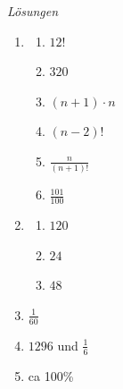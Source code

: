 \clearpage
\emph{Lösungen}

\begin{enumerate}
    \item
          \begin{enumerate}
              \item \(12!\)
              \item \(320\)
              \item \((n+1) \cdot n\)
              \item   \((n - 2)!\)
              \item \(\frac{n}{ (n+1)!}\)
              \item   \(\frac{101}{100}\)
          \end{enumerate}

    \item
          \begin{enumerate}
              \item \(120\)
              \item \(24\)
              \item \(48\)
          \end{enumerate}
    \item \(\frac{1}{60}\)
    \item \(1296\) und \(\frac{1}{6}\)
    \item ca 100\%
\end{enumerate}






















\clearpage
